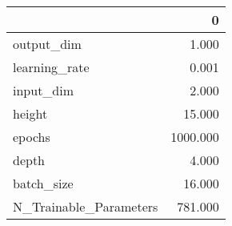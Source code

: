 \begin{tabular}{lr}
\toprule
{} &         0 \\
\midrule
output\_dim             &     1.000 \\
learning\_rate          &     0.001 \\
input\_dim              &     2.000 \\
height                 &    15.000 \\
epochs                 &  1000.000 \\
depth                  &     4.000 \\
batch\_size             &    16.000 \\
N\_Trainable\_Parameters &   781.000 \\
\bottomrule
\end{tabular}
